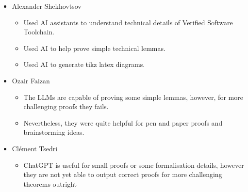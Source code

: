 \documentclass[
  a4paper, twocolumn, DIV=calc]{scrartcl}
\providecommand{\tightlist}{%
  \setlength{\itemsep}{0pt}\setlength{\parskip}{0pt}}
\begin{document}
\begin{itemize}
\tightlist
\item
  Alexander Shekhovtsov
  \begin{itemize}
  \tightlist
  \item
    Used AI assistants to understand technical details of Verified Software Toolchain. 
    \item Used AI to help prove simple technical lemmas.
  \item 
    Used AI to generate tikz latex diagrams.
  \end{itemize}
\item
  Ozair Faizan
  \begin{itemize}
  \tightlist
  \item
    The LLMs are capable of proving some simple lemmas, however, for
    more challenging proofs they fails.
  \item
    Nevertheless, they were quite helpful for pen and paper proofs and
    brainstorming ideas.
  \end{itemize}
\item
  Clément Tsedri
  \begin{itemize}
  \tightlist
  \item
    ChatGPT is useful for small proofs or some formalisation details, 
    however they are not yet able to output correct proofs for more 
    challenging theorems outright
  \end{itemize}
\end{itemize}

\printbibliography
\end{document}

